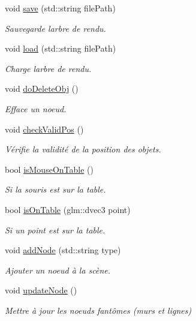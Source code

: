 \begin{DoxyCompactItemize}
void \hyperlink{group__inf2990_ga32032b986fdb830fb158dbd354aa55e7}{save} (std\+::string file\+Path)
\begin{DoxyCompactList}\small\item\em Sauvegarde l\textquotesingle{}arbre de rendu. \end{DoxyCompactList}\item 
void \hyperlink{group__inf2990_ga4a34752db2d5c26cf97baca584c27dec}{load} (std\+::string file\+Path)
\begin{DoxyCompactList}\small\item\em Charge l\textquotesingle{}arbre de rendu. \end{DoxyCompactList}\item 
void \hyperlink{group__inf2990_gaa41bbec7d5381099ca3b945b6ed2675f}{do\+Delete\+Obj} ()
\begin{DoxyCompactList}\small\item\em Efface un noeud. \end{DoxyCompactList}\item 
void \hyperlink{group__inf2990_ga612cbe4c05f2e8adfb632db4fb1a3cf0}{check\+Valid\+Pos} ()
\begin{DoxyCompactList}\small\item\em Vérifie la validité de la position des objets. \end{DoxyCompactList}\item 
bool \hyperlink{group__inf2990_gaaaa7ff115548c42faa0570a3c7c4648e}{is\+Mouse\+On\+Table} ()
\begin{DoxyCompactList}\small\item\em Si la souris est sur la table. \end{DoxyCompactList}\item 
bool \hyperlink{group__inf2990_ga58f9c6d2f80118bcdf95e1967a455bea}{is\+On\+Table} (glm\+::dvec3 point)
\begin{DoxyCompactList}\small\item\em Si un point est sur la table. \end{DoxyCompactList}\item 
void \hyperlink{group__inf2990_ga22eeedd655650984efa7da6d3d2564eb}{add\+Node} (std\+::string type)
\begin{DoxyCompactList}\small\item\em Ajouter un noeud à la scène. \end{DoxyCompactList}\item 
void \hyperlink{group__inf2990_ga3d780d2a98e5abe59033ba9791065d7d}{update\+Node} ()
\begin{DoxyCompactList}\small\item\em Mettre à jour les noeuds fantômes (murs et lignes) \end{DoxyCompactList}\item 

\end{DoxyCompactItemize}
